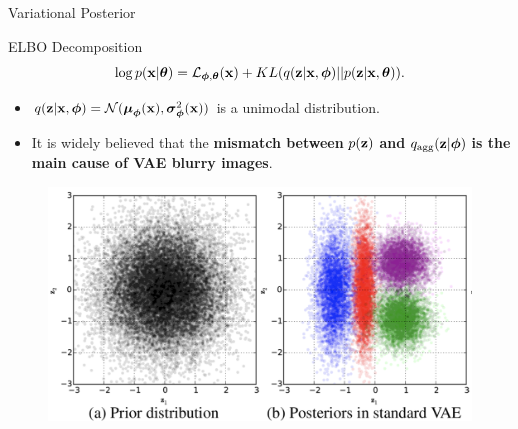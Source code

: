 \documentclass{beamer}
\begin{document}
\begin{frame}{Variational Posterior}
	\begin{block}{ELBO Decomposition}
		\vspace{-0.3cm}
		\[
			\log p(\mathbf{x} | \boldsymbol{\theta}) =\mathcal{L}_{\boldsymbol{\phi}, \boldsymbol{\theta}}(\mathbf{x}) + KL(q(\mathbf{z} | \mathbf{x}, \boldsymbol{\phi}) || p(\mathbf{z} | \mathbf{x}, \boldsymbol{\theta})).
		\]
		\vspace{-0.5cm}
	\end{block}
	\begin{itemize}
		\item $q(\mathbf{z} | \mathbf{x}, \boldsymbol{\phi}) = \mathcal{N}(\boldsymbol{\mu}_{\boldsymbol{\phi}}(\mathbf{x}), \boldsymbol{\sigma}^2_{\boldsymbol{\phi}}(\mathbf{x}))$ is a unimodal distribution. 
		\item It is widely believed that the \textbf{mismatch between} $p(\mathbf{z})$  \textbf{and} $q_{\text{agg}}(\mathbf{z} | \boldsymbol{\phi})$  \textbf{is the main cause of VAE blurry images}.
	\end{itemize}
	\begin{figure}
		\includegraphics[width=0.8\linewidth]{figs/agg_posterior}
	\end{figure}
\end{frame}
\end{document}
